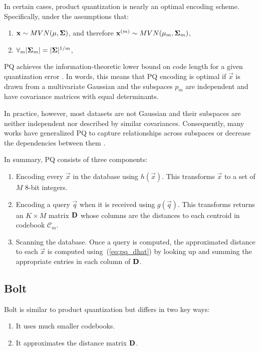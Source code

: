 In certain cases, product quantization is nearly an optimal encoding scheme. Specifically, under the assumptions that:
\begin{enumerate}[leftmargin=7mm]
\item $\mathbf{x} \sim MVN(\mathbf{\mu}, \mathbf{\Sigma})$, and therefore $\mathbf{x}^{(m)} \sim MVN(\mathbf{\mu}_m, \mathbf{\Sigma}_m)$,
\item $\forall_m |\mathbf{\Sigma}_m| = |\mathbf{\Sigma}|^{1/m}$,
\end{enumerate}
PQ achieves the information-theoretic lower bound on code length for a given quantization error \cite{opq}. In words, this means that PQ encoding is optimal if $\vec{x}$ is drawn from a multivariate Gaussian and the subspaces $p_m$ are independent and have covariance matrices with equal determinants.

In practice, however, most datasets are not Gaussian and their subspaces are neither independent nor described by similar covariances. Consequently, many works have generalized PQ to capture relationships across subspaces or decrease the dependencies between them \cite{opq, cartesianKmeans, aq, otq, lsq}.

In summary, PQ consists of three components:
\begin{enumerate}[leftmargin=7mm]
    \item Encoding every $\vec{x}$ in the database using $h(\vec{x})$. This transforms $\vec{x}$ to a set of $M$ 8-bit integers.
    \item Encoding a query $\vec{q}$ when it is received using $g(\vec{q})$. This transforms returns an $K \times M$ matrix $\mathbf{D}$ whose columns are the distances to each centroid in codebook $\mathcal{C}_m$.
    \item Scanning the database. Once a query is computed, the approximated distance to each $\vec{x}$ is computed using~(\ref{eq:pq_dhat}) by looking up and summing the appropriate entries in each column of $\mathbf{D}$.
\end{enumerate}

\subsection{Bolt}

Bolt is similar to product quantization but differs in two key ways:
\begin{enumerate}[leftmargin=7mm]
\item It uses much smaller codebooks.
\item It approximates the distance matrix $\mathbf{D}$.
\end{enumerate}

